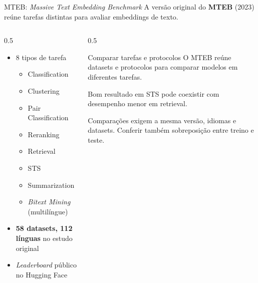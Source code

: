 \documentclass[aspectratio=169, xcolor=dvipsnames]{beamer}
\begin{document}
  \begin{frame}{MTEB: \textit{Massive Text Embedding Benchmark}}
    \small
    A versão original do \textbf{MTEB} (2023) reúne tarefas distintas
    para avaliar embeddings de texto.
    \vspace{0.3em}
    \begin{columns}
      \begin{column}{0.5\textwidth}
        \begin{itemize}
          \item 8 tipos de tarefa
            \begin{itemize}
              \item Classification
              \item Clustering
              \item Pair Classification
              \item Reranking
              \item Retrieval
              \item STS
              \item Summarization
              \item \textit{Bitext Mining} (multilíngue)
            \end{itemize}
          \item \textbf{58 datasets, 112 línguas} no estudo original
          \item \textit{Leaderboard} público no Hugging Face
        \end{itemize}
        \vspace{0.3em}
      \end{column}
      \begin{column}{0.5\textwidth}
        \begin{alertblock}{Comparar tarefas e protocolos}
          O MTEB reúne datasets e protocolos para comparar modelos em diferentes tarefas.

          \vspace{0.3em}
          Bom resultado em STS pode coexistir com desempenho menor em retrieval.

          \vspace{0.3em}
          Comparações exigem a mesma versão, idiomas e datasets.
          Conferir também sobreposição entre treino e teste.
        \end{alertblock}
      \end{column}
    \end{columns}
  \end{frame}
\end{document}
